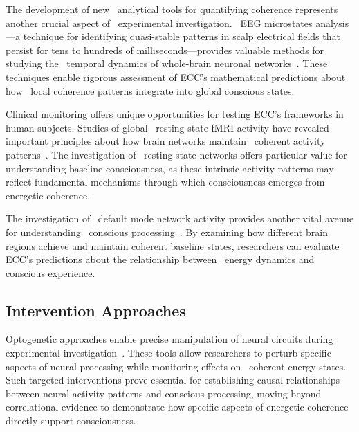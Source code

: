 The development of new~ analytical tools for quantifying coherence represents another crucial aspect of~ experimental investigation.~ EEG microstates analysis—a technique for identifying quasi-stable patterns in scalp electrical fields that persist for tens to hundreds of milliseconds—provides valuable methods for studying the~ temporal dynamics of whole-brain neuronal networks~\cite{Michel2018, van2025processes}. These techniques enable rigorous assessment of ECC's mathematical predictions about how~ local coherence patterns integrate into global conscious states.

 Clinical monitoring offers unique opportunities for testing ECC's frameworks in human subjects. Studies of global~ resting-state fMRI activity have revealed important principles about how brain networks maintain~ coherent activity patterns~\cite{Scholvinck2013, Fox2010}. The investigation of~ resting-state networks offers particular value for understanding baseline consciousness, as these intrinsic activity patterns may reflect fundamental mechanisms through which consciousness emerges from~ energetic coherence.

The investigation of~ default mode network activity provides another vital avenue for understanding~ conscious processing~\cite{Raichle2015}. By examining how different brain regions achieve and maintain coherent baseline states, researchers can evaluate ECC's predictions about the relationship between~ energy dynamics and conscious experience.

\subsection*{Intervention Approaches}

 Optogenetic approaches enable precise manipulation of neural circuits during experimental investigation~\cite{Yizhar2011}. These tools allow researchers to perturb specific aspects of neural processing while monitoring effects on~ coherent energy states. Such targeted interventions prove essential for establishing causal relationships between neural activity patterns and conscious processing, moving beyond correlational evidence to demonstrate how specific aspects of energetic coherence directly support consciousness.

